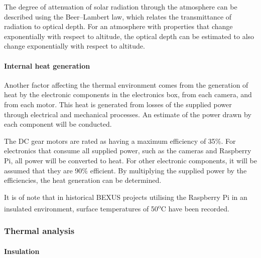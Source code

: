 The degree of attenuation of solar radiation through the atmosphere can be described using the Beer–Lambert law, which relates the transmittance of radiation to optical depth. For an atmosphere with properties that change exponentially with respect to altitude, the optical depth can be estimated to also change exponentially with respect to altitude. \\

\paragraph{Internal heat generation}
Another factor affecting the thermal environment comes from the generation of heat by the electronic components in the electronics box, from each camera, and from each motor. This heat is generated from losses of the supplied power through electrical and mechanical processes. An estimate of the power drawn by each component will be conducted.



The DC gear motors are rated as having a maximum efficiency of 35\%. 
For electronics that consume all supplied power, such as the cameras and Raspberry Pi, all power will be converted to heat.
For other electronic components, it will be assumed that they are 90\% efficient. By multiplying the supplied power by the efficiencies, the heat generation can be determined.



It is of note that in historical BEXUS projects utilising the Raspberry Pi in an insulated environment, surface temperatures of 50\textsuperscript{o}C have been recorded. 





















\subsubsection{Thermal analysis}

\paragraph{Insulation}

